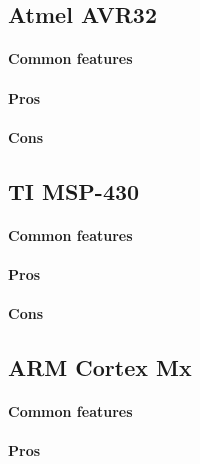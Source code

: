 \documentclass[a4paper,10pt]{article}
\begin{document}
\begin{multicols}{2}
\subsection{Atmel AVR32}

\TODO


\paragraph{Common features}
\TODO


\paragraph{Pros}
\TODO


\paragraph{Cons}
\TODO


\subsection{TI MSP-430}

\TODO


\paragraph{Common features}
\TODO


\paragraph{Pros}
\TODO


\paragraph{Cons}
\TODO


\subsection{ARM Cortex Mx}

\TODO


\paragraph{Common features}
\TODO


\paragraph{Pros}
\TODO



\end{multicols}
\end{document}
